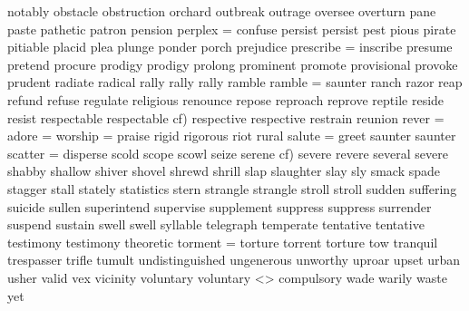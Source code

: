 notably  
obstacle   
obstruction   
orchard  
outbreak   
outrage   
oversee   
overturn   
pane  
paste   
pathetic   
patron   
pension   
perplex = confuse  
persist  
persist  
pest  
pious   
pirate  
pitiable   
placid   
plea   
plunge   
ponder   
porch  
prejudice   
prescribe = inscribe  
presume  
pretend  
procure   
prodigy  
prodigy  
prolong   
prominent   
promote   
provisional  
provoke   
prudent  
radiate  
radical   
rally  
rally   
rally  
ramble  
ramble = saunter  
ranch   
razor   
reap   
refund   
refuse   
regulate   
religious   
renounce   
repose  
reproach   
reprove   
reptile   
reside   
resist   
respectable  
respectable cf) respective  
respective  
restrain   
reunion   
rever = adore = worship = praise  
rigid   
rigorous   
riot   
rural   
salute = greet  
saunter  
saunter  
scatter = disperse   
scold   
scope   
scowl   
seize   
serene  cf) severe   revere    
several  
severe  
shabby   
shallow  
shiver   
shovel   
shrewd  
shrill   
slap   
slaughter  
slay  
sly   
smack   
spade   
stagger  
stall   
stately   
statistics  
stern   
strangle  
strangle  
stroll  
stroll  
sudden   
suffering   
suicide   
sullen  
superintend   
supervise   
supplement  
suppress  
suppress  
surrender   
suspend   
sustain   
swell   
swell  
syllable  
telegraph   
temperate  
tentative  
tentative  
testimony  
testimony  
theoretic   
torment = torture   
torrent   
torture   
tow   
tranquil   
trespasser   
trifle  
tumult   
undistinguished   
ungenerous   
unworthy   
uproar   
upset   
urban   
usher  
valid   
vex   
vicinity  
voluntary  
voluntary <> compulsory  
wade   
warily  
waste   
yet   
  
  
  
  
  
  
  
  
  
  
  
  
  
  
  
  
  
  
  
  
  
  
  
  
  
  
  
  
  
  
  
  
  
  
  
  
  
  
  
  
  

